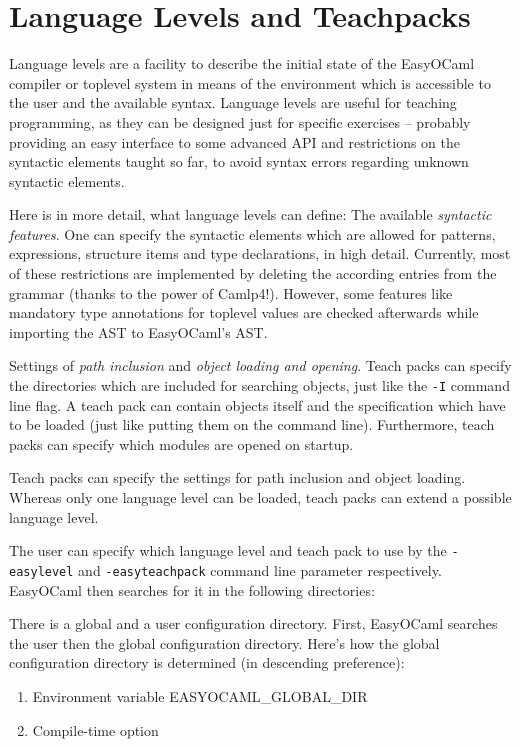
\section{Language Levels and Teachpacks}
\label{hd004}
Language levels are a facility to describe the initial state of the 
EasyOCaml compiler or toplevel system in means of the environment which 
is accessible to the user and the available syntax.  Language levels are 
useful for teaching programming, as they can be designed just for 
specific exercises -- probably providing an easy interface to some 
advanced API and restrictions on the syntactic elements taught so far, 
to avoid syntax errors regarding unknown syntactic elements.

Here is in more detail, what language levels can define: The available 
\emph{syntactic features}.  One can specify the syntactic elements which 
are allowed for patterns, expressions, structure items and type 
declarations, in high detail. Currently, most of these restrictions are 
implemented by deleting the according entries from the grammar (thanks 
to the power of Camlp4!).  However, some features like mandatory type 
annotations for toplevel values are checked afterwards while importing 
the AST to EasyOCaml's AST.

Settings of \emph{path inclusion} and \emph{object loading and opening}.  
Teach packs can specify the directories which are included for searching 
objects, just like the \texttt{-I} command line flag.  A teach pack can 
contain objects itself and the specification which have to be loaded 
(just like putting them on the command line).  Furthermore, teach packs 
can specify which modules are opened on startup.

Teach packs can specify the settings for path inclusion and object 
loading. Whereas only one language level can be loaded, teach packs can 
extend a possible language level.

The user can specify which language level and teach pack to use by the 
\texttt{-easylevel} and \texttt{-easyteachpack} command line parameter 
respectively. EasyOCaml then searches for it in the following 
directories:

There is a global and a user configuration directory. First, EasyOCaml 
searches the user then the global configuration directory.  Here's how 
the global configuration directory is determined (in descending 
preference):

\begin{enumerate}
    \item Environment variable EASYOCAML\_GLOBAL\_DIR
    \item Compile-time option
\end{enumerate}

